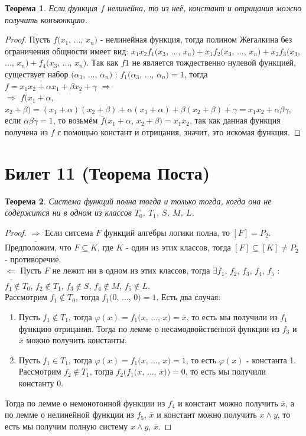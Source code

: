 \documentclass[a4paper, 12pt]{article}
\renewcommand{\phi}{\varphi}
\theoremstyle{definition}
\theoremstyle{plain}
\newtheorem*{theorem}{Теорема}
\theoremstyle{remark}
\begin{document}
  \begin{theorem}
    Если функция $f$ нелинейна, то из неё, констант и отрицания можно получить конъюнкцию.
  \end{theorem}
  \begin{proof}
    Пусть $f(x_1$, $\ldots$, $x_n)$ - нелинейная функция, тогда полином Жегалкина без ограничения общности имеет вид: $x_1x_2f_1(x_3$, $\ldots$, $x_n)+x_1f_2(x_3$, $\ldots$, $x_n)+x_2f_3(x_3$, $\ldots$, $x_n)+f_4(x_3$, $\ldots$, $x_n)$. Так как $f1$ не является тождественно нулевой функцией, существует набор $(\alpha_3$, $\ldots$, $\alpha_n)$ : $f_1(\alpha_3$, $\ldots$, $\alpha_n)=1$, тогда $f=x_1x_2+\alpha x_1+\beta x_2+\gamma$ $\Longrightarrow$\\
    $\Longrightarrow$ $f(x_1+\alpha$, $x_2+\beta)=(x_1+\alpha)(x_2+\beta)+\alpha(x_1+\alpha)+\beta(x_2+\beta)+\gamma=x_1x_2+\alpha\beta\gamma$, если $\alpha\beta\gamma=1$, то возьмём $\overline{f}(x_1+\alpha$, $x_2+\beta)=x_1x_2$,  так как данная функция получена из $f$ с помощью констант и отрицания, значит, это искомая функция.
  \end{proof}
  \section{Билет 11 (Теорема Поста)}
  \begin{theorem}
    Система функций полна тогда и только тогда, когда она не содержится ни в одном из классов $T_0$, $T_1$, $S$, $M$, $L$.
  \end{theorem}
  \begin{proof}
    $\underline{\Longrightarrow}$ Если ситсема $F$ функций алгебры логики полна, то $[F]=P_2$. Предположим, что $F\subseteq K$, где $K$ - один из этих классов, тогда $[F]\subseteq[K]\neq P_2$ - противоречие.\\
    $\underline{\Longleftarrow}$ Пусть $F$ не лежит ни в одном из этих классов, тогда $\exists f_1$, $f_2$, $f_3$, $f_4$, $f_5$ : $f_1\notin T_0$, $f_2\notin T_1$, $f_3\notin S$, $f_4\notin M$, $f_5\notin L$.\\
    Рассмотрим $f_1\notin T_0$, тогда $f_1(0$, $\ldots$, $0)=1$. Есть два случая:
    \begin{enumerate}
      \item Пусть $f_1\notin T_1$, тогда $\phi(x)=f_1(x$, $\ldots$, $x)=\overline{x}$, то есть мы получили из $f_1$ функцию отрицания. Тогда по лемме о несамодвойственной функции из $f_3$ и $\overline{x}$ можно получить константы.
      \item Пусть $f_1\in T_1$, тогда $\phi(x)=f_1(x$, $\ldots$, $x)=1$, то есть $\phi(x)$ - константа 1. Рассмотрим $f_2\notin T_1$, тогда $f_2(f_1(x$, $\ldots$, $x))=0$, то есть мы получили константу 0.
    \end{enumerate}
    Тогда по лемме о немонотонной функции из $f_4$ и констант можно получить $\overline{x}$, а по лемме о нелинейной функции из $f_5$, $\overline{x}$ и констант можно получить $x\wedge y$, то есть мы получим полную систему {$x\wedge y$, $\overline{x}$}.
  \end{proof}
\end{document}
